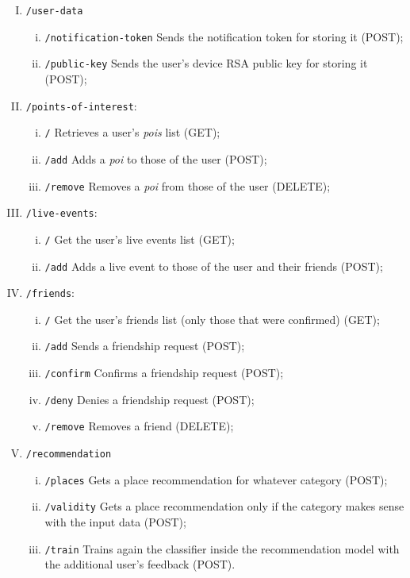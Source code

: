 \documentclass[../../main]{subfiles}
\begin{document}
\begin{enumerate}[I)]
    \item \texttt{/user-data}
    \begin{enumerate}[i)]
        \item \texttt{/notification-token} Sends the notification token for storing it (POST);
        \item \texttt{/public-key} Sends the user's device RSA public key for storing it (POST);
    \end{enumerate}

    \item \texttt{/points-of-interest}:
    \begin{enumerate}[i)]
        \item \texttt{/} Retrieves a user's \textit{pois} list (GET);
        \item \texttt{/add} Adds a \textit{poi} to those of the user (POST);
        \item \texttt{/remove} Removes a \textit{poi} from those of the user (DELETE);
    \end{enumerate}

    \item \texttt{/live-events}:
    \begin{enumerate}[i)]
        \item \texttt{/} Get the user's live events list (GET);
        \item \texttt{/add} Adds a live event to those of the user and their friends (POST);
    \end{enumerate}

    \item \texttt{/friends}:
    \begin{enumerate}[i)]
        \item \texttt{/} Get the user's friends list (only those that were confirmed) (GET);
        \item \texttt{/add} Sends a friendship request (POST);
        \item \texttt{/confirm} Confirms a friendship request (POST);
        \item \texttt{/deny} Denies a friendship request (POST);
        \item \texttt{/remove} Removes a friend (DELETE);
    \end{enumerate}
    
    \item \texttt{/recommendation}
    \begin{enumerate}[i)]
        \item \texttt{/places} Gets a place recommendation for whatever category (POST);
        \item \texttt{/validity} Gets a place recommendation only if the category makes sense with the input data (POST);
        \item \texttt{/train} Trains again the classifier inside the recommendation model with the additional user's feedback (POST).
    \end{enumerate}
\end{enumerate}
\end{document}
